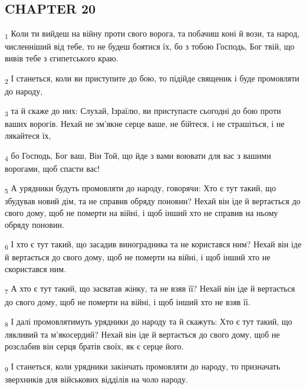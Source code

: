 \subsection{CHAPTER 20}
\begin{tcolorbox}
\textsubscript{1} Коли ти вийдеш на війну проти свого ворога, та побачиш коні й вози, та народ, численніший від тебе, то не будеш боятися їх, бо з тобою Господь, Бог твій, що вивів тебе з єгипетського краю.
\end{tcolorbox}
\begin{tcolorbox}
\textsubscript{2} І станеться, коли ви приступите до бою, то підійде священик і буде промовляти до народу,
\end{tcolorbox}
\begin{tcolorbox}
\textsubscript{3} та й скаже до них: Слухай, Ізраїлю, ви приступаєте сьогодні до бою проти ваших ворогів. Нехай не зм'якне серце ваше, не бійтеся, і не страшіться, і не лякайтеся їх,
\end{tcolorbox}
\begin{tcolorbox}
\textsubscript{4} бо Господь, Бог ваш, Він Той, що йде з вами воювати для вас з вашими ворогами, щоб спасти вас!
\end{tcolorbox}
\begin{tcolorbox}
\textsubscript{5} А урядники будуть промовляти до народу, говорячи: Хто є тут такий, що збудував новий дім, та не справив обряду поновин? Нехай він іде й вертається до свого дому, щоб не померти на війні, і щоб інший хто не справив на ньому обряду поновин.
\end{tcolorbox}
\begin{tcolorbox}
\textsubscript{6} І хто є тут такий, що засадив виноградника та не користався ним? Нехай він іде й вертається до свого дому, щоб не померти на війні, і щоб інший хто не скористався ним.
\end{tcolorbox}
\begin{tcolorbox}
\textsubscript{7} А хто є тут такий, що засватав жінку, та не взяв її? Нехай він іде й вертається до свого дому, щоб не померти на війні, і щоб інший хто не взяв її.
\end{tcolorbox}
\begin{tcolorbox}
\textsubscript{8} І далі промовлятимуть урядники до народу та й скажуть: Хто є тут такий, що лякливий та м'якосердий? Нехай він іде й вертається до свого дому, щоб не розслабив він серця братів своїх, як є серце його.
\end{tcolorbox}
\begin{tcolorbox}
\textsubscript{9} І станеться, коли урядники закінчать промовляти до народу, то призначать зверхників для військових відділів на чоло народу.
\end{tcolorbox}

